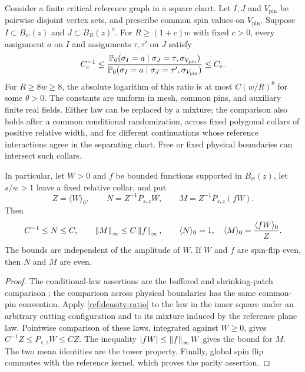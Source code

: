 \begin{lemma}
\label{ref:comparison}
Consider a finite critical reference graph in a square chart.  Let $I,J$ and
$V_{\mathrm{pin}}$ be pairwise disjoint vertex sets, and prescribe common
spin values on $V_{\mathrm{pin}}$.  Suppose $I\subset B_w(z)$ and
$J\subset B_R(z)^c$.  For $R\ge(1+c)w$ with fixed $c>0$, every assignment
$a$ on $I$ and assignments $\tau,\tau'$ on $J$ satisfy
\begin{equation}\label{ref:density-ratio}
 C_c^{-1}\le
 \frac{\mathbb P_0(\sigma_I=a\mid\sigma_J=\tau,\sigma_{V_{\mathrm{pin}}})}
      {\mathbb P_0(\sigma_I=a\mid\sigma_J=\tau',\sigma_{V_{\mathrm{pin}}})}
 \le C_c.
\end{equation}
For $R\ge8w\ge8$, the absolute logarithm of this ratio is at most
$C(w/R)^\theta$ for some $\theta>0$.  The constants are uniform in mesh,
common pins, and auxiliary finite real fields.  Either law can be replaced
by a mixture; the comparison also holds after a common conditional
randomization, across fixed polygonal collars of positive relative width,
and for different continuations whose reference interactions agree in the
separating chart.  Free or fixed physical boundaries can intersect such
collars.

In particular, let $W>0$ and $f$ be bounded functions supported in $B_w(z)$,
let $s/w>1$ leave a fixed relative collar, and put
\begin{equation}\label{ref:normalized-weights}
 Z=\langle W\rangle_0,\qquad
 N=Z^{-1}P_{s,z}W,\qquad M=Z^{-1}P_{s,z}(fW).
\end{equation}
Then
\begin{equation}\label{ref:weight-bounds}
 C^{-1}\le N\le C,\qquad \left\lVert M\right\rVert_\infty\le C\left\lVert f\right\rVert_\infty,
 \qquad \langle N\rangle_0=1,\quad
 \langle M\rangle_0=\frac{\langle fW\rangle_0}{Z}.
\end{equation}
The bounds are independent of the amplitude of $W$.  If $W$ and $f$ are
spin-flip even, then $N$ and $M$ are even.
\end{lemma}

\begin{proof}
The conditional-law assertions are the buffered and shrinking-patch
comparison \cite[Corollary~2.2]{ReferenceIsing}; the comparison across
physical boundaries has the same common-pin convention.  Apply
\eqref{ref:density-ratio} to the law in the inner square under an arbitrary
cutting configuration and to its mixture induced by the reference plane
law.  Pointwise comparison of these laws, integrated against $W\ge0$,
gives $C^{-1}Z\le P_{s,z}W\le CZ$.  The inequality
$|fW|\le\left\lVert f\right\rVert_\infty W$ gives the bound for $M$.  The two mean
identities are the tower property.  Finally, global spin flip commutes
with the reference kernel, which proves the parity assertion.
\end{proof}

